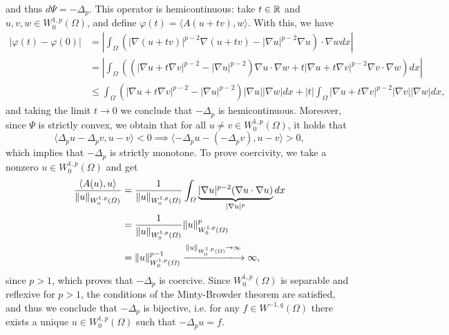 and thus $d\Psi = -\Delta_p$. This operator is hemicontinuous: take $t\in \mathbb{R}$ and $u,v,w\in W_0^{1,p}(\Omega)$, and define $\varphi(t) = \langle A(u+tv),w\rangle$. With this, we have
\begin{align*}
    |\varphi(t)-\varphi(0)| &= \left|\int_\Omega \left(|\nabla (u+tv)|^{p-2}\nabla (u+tv) - |\nabla u|^{p-2}\nabla u\right)\cdot \nabla w dx \right|\\
    &= \left|\int_\Omega \left((|\nabla u + t\nabla v|^{p-2} - |\nabla u|^{p-2})\nabla u \cdot \nabla w + t|\nabla u + t\nabla v|^{p-2} \nabla v\cdot \nabla w \right) dx\right|\\
    &\leq \int_\Omega \left(|\nabla u + t\nabla v|^{p-2} - |\nabla u|^{p-2}\right)|\nabla u||\nabla w| dx + |t|\int_\Omega |\nabla u + t\nabla v|^{p-2}|\nabla v||\nabla w| dx,
\end{align*}
and taking the limit $t\to 0$ we conclude that $-\Delta_p$ is hemicontinuous. Moreover, since $\Psi$ is strictly convex, we obtain that for all $u\neq v \in W_0^{1,p}(\Omega)$, it holds that
\begin{equation*}
    \langle \Delta_p u - \Delta_p v, u-v\rangle < 0 \implies \langle -\Delta_p u - (-\Delta_p v), u-v\rangle > 0,
\end{equation*}
which implies that $-\Delta_p$ is strictly monotone. To prove coercivity, we take a nonzero $u\in W_0^{1,p}(\Omega)$ and get
\begin{align*}
    \frac{\langle A(u),u\rangle}{\|u\|_{W_0^{1,p}(\Omega)}} &= \frac{1}{\|u\|_{W_0^{1,p}(\Omega)}}\int_\Omega \underbrace{|\nabla u|^{p-2}(\nabla u\cdot\nabla u)}_{|\nabla u|^p} dx\\
    &= \frac{1}{\|u\|_{W_0^{1,p}(\Omega)}}\|u\|_{W_0^{1,p}(\Omega)}^p\\
    &= \|u\|_{W_0^{1,p}(\Omega)}^{p-1}\xlongrightarrow{\|u\|_{W_0^{1,p}(\Omega)}\to\infty}\infty,
\end{align*}
since $p>1$, which proves that $-\Delta_p$ is coercive. Since $W_0^{1,p}(\Omega)$ is separable and reflexive for $p>1$, the conditions of the Minty-Browder theorem are satisfied, and thus we conclude that $-\Delta_p$ is bijective, i.e. for any $f\in W^{-1,q}(\Omega)$ there exists a unique $u\in W_0^{1,p}(\Omega)$ such that $-\Delta_p u = f$.

